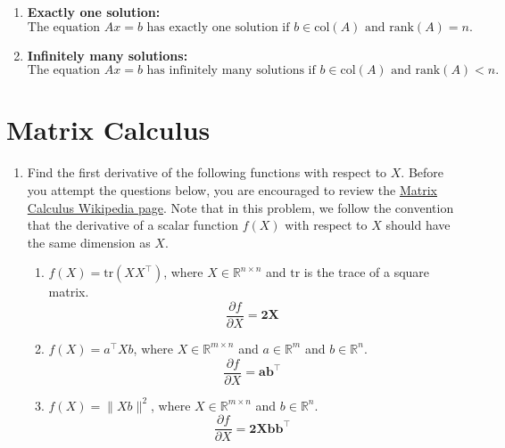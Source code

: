 \documentclass[a3paper,12pt]{extarticle} %
\begin{document}
\begin{enumerate}
\begin{enumerate}
        \item \textbf{Exactly one solution:}
        \[
        \text{The equation } Ax = b \text{ has exactly one solution if } b \in \text{col}(A) \text{ and } \text{rank}(A) = n.
        \]
        
        \item \textbf{Infinitely many solutions:}
        \[
        \text{The equation } Ax = b \text{ has infinitely many solutions if } b \in \text{col}(A) \text{ and } \text{rank}(A) < n. 
        \]
    \end{enumerate}
\end{enumerate}
\newpage
\section{Matrix Calculus}
\begin{enumerate}
    \item Find the first derivative of the following functions with respect to \( X \). Before you attempt the questions below, you are encouraged to review the  \href{https://en.wikipedia.org/wiki/Matrix_calculus}{Matrix Calculus Wikipedia page}. Note that in this problem, we follow the convention that the derivative of a scalar function \( f(X) \) with respect to \( X \) should have the same dimension as \( X \).
    \begin{enumerate}
        \item \( f(X) = \text{tr}(XX^\top) \), where \( X \in \mathbb{R}^{n \times n} \) and \(\text{tr}\) is the trace of a square matrix.
        \[
        \frac{\partial f}{\partial X} = \mathbf{2X}
        \]

        \item \( f(X) = a^\top X b \), where \( X \in \mathbb{R}^{m \times n} \) and \( a \in \mathbb{R}^m \) and \( b \in \mathbb{R}^n \).
        \[
        \frac{\partial f}{\partial X} = \mathbf{ab^\top}
        \]

        \item \( f(X) = \|Xb\|^2 \), where \( X \in \mathbb{R}^{m \times n} \) and \( b \in \mathbb{R}^n \).
        \[
        \frac{\partial f}{\partial X} = \mathbf{2Xbb^\top}
        \]
    \end{enumerate}
\end{enumerate}
\newpage
\end{document}
